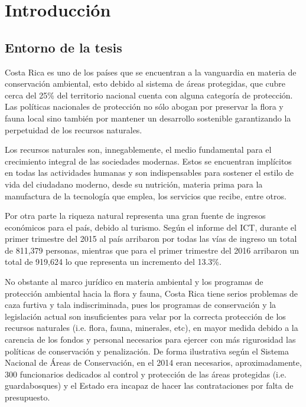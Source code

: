 
\chapter{Introducción}
\label{chp:intro}
\section{Entorno de la tesis}

Costa Rica es uno de los países que se encuentran a la vanguardia en materia de conservación ambiental, esto debido al sistema de áreas protegidas, que cubre cerca del 25\% del territorio nacional cuenta con alguna categoría de protección. Las políticas nacionales de protección no sólo abogan por preservar la flora y fauna local sino también por mantener un desarrollo sostenible garantizando la perpetuidad de los recursos naturales. \cite{website:sinac}

Los recursos naturales son, innegablemente, el medio fundamental para el crecimiento integral de las sociedades modernas. Estos se encuentran implícitos en todas las actividades humanas y son indispensables para sostener el estilo de vida del ciudadano moderno, desde su nutrición, materia prima para la manufactura de la tecnología que emplea, los servicios que recibe, entre otros. \cite{website:inbio}

Por otra parte la riqueza natural representa una gran fuente de ingresos económicos para el país, debido al turismo. Según el informe del ICT, durante el primer trimestre del 2015 al país arribaron por todas las vías de ingreso un total de 811,379 personas, mientras que para el primer trimestre del 2016 arribaron un total de 919,624 lo que representa un incremento del 13.3\%. \cite{website:ict}

No obstante al marco jurídico en materia ambiental y los programas de protección ambiental hacia la flora y fauna, Costa Rica tiene serios problemas de caza furtiva y tala indiscriminada, pues los programas de conservación y la legislación actual son insuficientes para velar por la correcta protección de los recursos naturales (i.e. flora, fauna, minerales, etc), en mayor medida debido a la carencia de los fondos y personal necesarios para ejercer con más rigurosidad las políticas de conservación y penalización. De forma ilustrativa según el Sistema Nacional de Áreas de Conservación, en el 2014 eran necesarios, aproximadamente, 300 funcionarios dedicados al control y protección de las áreas protegidas (i.e. guardabosques) y el Estado era incapaz de hacer las contrataciones por falta de presupuesto. \cite{website:sinac}

